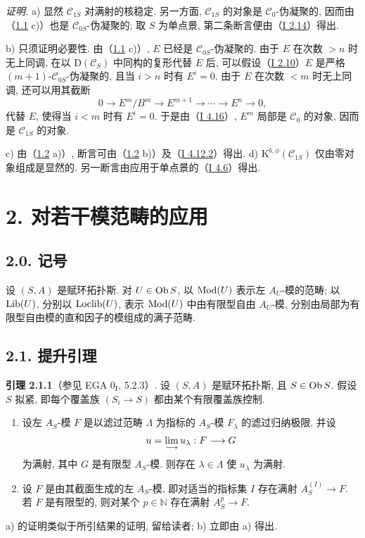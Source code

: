 \emph{证明.} a) 显然 $\mathcal C_{1S}$ 对满射的核稳定. 另一方面, $\mathcal C_{1S}$ 的对象是 $\mathcal C_0$-伪凝聚的, 因而由（\hyperlink{sga6.e02.prop.1-1}{1.1} c)）也是 $\mathcal C_{0S}$-伪凝聚的; 取 $S$ 为单点景, 第二条断言便由（\hyperlink{sga6.e01.cor.2-14}{I 2.14}）得出.

b) 只须证明必要性. 由（\hyperlink{sga6.e02.prop.1-1}{1.1} c)）, $E$ 已经是 $\mathcal C_{0S}$-伪凝聚的. 由于 $E$ 在次数 $>n$ 时无上同调, 在以 $\mathrm D(\mathcal C_S)$ 中同构的复形代替 $E$ 后, 可以假设（\hyperlink{sga6.e01.prop.2-10}{I 2.10}）$E$ 是严格 $(m+1)$-$\mathcal C_{0S}$-伪凝聚的, 且当 $i>n$ 时有 $E^i=0$. 由于 $E$ 在次数 $<m$ 时无上同调, 还可以用其截断
\[
0\longrightarrow E^m/B^m\longrightarrow E^{m+1}\longrightarrow\cdots\longrightarrow E^n\longrightarrow0,
\]
代替 $E$, 使得当 $i<m$ 时有 $E^i=0$. 于是由（\hyperlink{sga6.e01.lem.4-16}{I 4.16}）, $E^m$ 局部是 $\mathcal C_0$ 的对象, 因而是 $\mathcal C_{1S}$ 的对象.

c) 由（\hyperlink{sga6.e02.prop.1-2}{1.2} a)）, 断言可由（\hyperlink{sga6.e02.prop.1-2}{1.2} b)）及（\hyperlink{sga6.e01.rem.4-12-2}{I 4.12.2}）得出. d) $\mathrm K^{b,\phi}(\mathcal C_{1S})$ 仅由零对象组成是显然的. 另一断言由应用于单点景的（\hyperlink{sga6.e01.cor.4-6}{I 4.6}）得出.

\section*{2. 对若干模范畴的应用}

\subsection*{2.0. 记号}
设 $(S,A)$ 是赋环拓扑斯. 对 $U\in\Ob S$, 以 $\Mod(U)$ 表示左 $A_U$-模的范畴; 以 $\Lib(U)$, 分别以 $\Loclib(U)$, 表示 $\Mod(U)$ 中由有限型自由 $A_U$-模, 分别由局部为有限型自由模的直和因子的模组成的满子范畴.

\subsection*{2.1. 提升引理}

\textbf{引理 2.1.1}（参见 EGA $0_{\mathrm I}$, 5.2.3）. 设 $(S,A)$ 是赋环拓扑斯, 且 $S\in\Ob S$. 假设 $S$ 拟紧, 即每个覆盖族 $(S_i\to S)$ 都由某个有限覆盖族控制.
\begin{enumerate}[label=\alph*)]
\item 设左 $A_S$-模 $F$ 是以滤过范畴 $\Lambda$ 为指标的 $A_S$-模 $F_\lambda$ 的滤过归纳极限, 并设
\[
u=\varinjlim u_\lambda:F\longrightarrow G
\]
为满射, 其中 $G$ 是有限型 $A_S$-模. 则存在 $\lambda\in\Lambda$ 使 $u_\lambda$ 为满射.
\item 设 $F$ 是由其截面生成的左 $A_S$-模, 即对适当的指标集 $I$ 存在满射 $A_S^{(I)}\to F$. 若 $F$ 是有限型的, 则对某个 $p\in\mathbb N$ 存在满射 $A_S^p\to F$.
\end{enumerate}
a) 的证明类似于所引结果的证明, 留给读者; b) 立即由 a) 得出.

